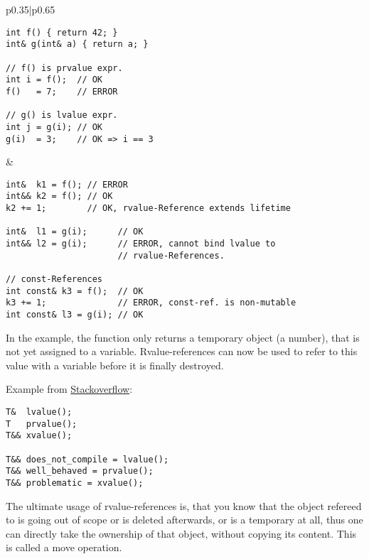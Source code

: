 \begin{tabular}{p{}|p{}}
\begin{verbatim}
int f() { return 42; }
int& g(int& a) { return a; }

// f() is prvalue expr.
int i = f();  // OK
f()   = 7;    // ERROR

// g() is lvalue expr.
int j = g(i); // OK
g(i)  = 3;    // OK => i == 3
\end{verbatim}
&
\begin{verbatim}
int&  k1 = f(); // ERROR
int&& k2 = f(); // OK
k2 += 1;        // OK, rvalue-Reference extends lifetime

int&  l1 = g(i);      // OK
int&& l2 = g(i);      // ERROR, cannot bind lvalue to
                      // rvalue-References.

// const-References
int const& k3 = f();  // OK
k3 += 1;              // ERROR, const-ref. is non-mutable
int const& l3 = g(i); // OK
\end{verbatim}
\end{tabular}

In the example, the function  only returns a temporary object (a number), that is not yet assigned to a variable. Rvalue-references can now
be used to refer to this value with a variable before it is finally destroyed.

\begin{example}
Example from \href{https://stackoverflow.com/questions/3716277/do-rvalue-references-allow-dangling-references}{Stackoverflow}:
\begin{verbatim}
T&  lvalue();
T   prvalue();
T&& xvalue();

T&& does_not_compile = lvalue();
T&& well_behaved = prvalue();
T&& problematic = xvalue();
\end{verbatim}
\end{example}

\begin{rem}
  The ultimate usage of rvalue-references is, that you know that the object refereed to is going out of scope or is deleted afterwards, or is a
  temporary at all, thus one can directly take the ownership of that object, without copying its content. This is called a move operation.
\end{rem}


